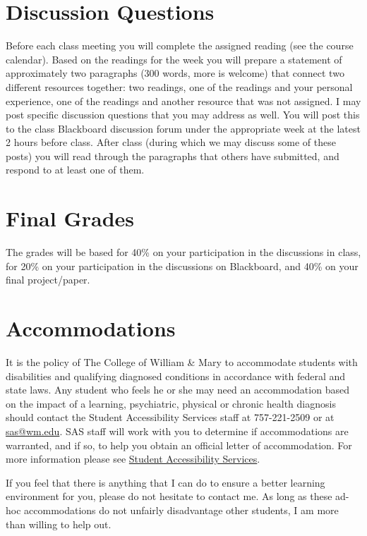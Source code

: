 \documentclass{article}
\begin{document}
\section{Discussion Questions}
Before each class meeting you will complete the assigned reading (see the course calendar). Based on the readings for the week you will prepare a statement of approximately two paragraphs (300 words, more is welcome) that connect two different resources together: two readings, one of the readings and your personal experience, one of the readings and another resource that was not assigned. I may post specific discussion questions that you may address as well. You will post this to the class Blackboard discussion forum under the appropriate week at the latest 2 hours before class. After class (during which we may discuss some of these posts) you will read through the paragraphs that others have submitted, and respond to at least one of them.

\section{Final Grades}
The grades will be based for 40\% on your participation in the discussions in class, for 20\% on your participation in the discussions on Blackboard, and 40\% on your final project/paper.

\section{Accommodations}
It is the policy of The College of William \& Mary to accommodate students with disabilities and qualifying diagnosed conditions in accordance with federal and state laws. Any student who feels he or she may need an accommodation based on the impact of a learning, psychiatric, physical or chronic health diagnosis should contact the Student Accessibility Services staff at 757-221-2509 or at \href{mailto:sas@wm.edu}{sas@wm.edu}. SAS staff will work with you to determine if accommodations are warranted, and if so, to help you obtain an official letter of accommodation. For more information please see \href{http://www.wm.edu/sas}{Student Accessibility Services}.

If you feel that there is anything that I can do to ensure a better learning environment for you, please do not hesitate to contact me. As long as these ad-hoc accommodations do not unfairly disadvantage other students, I am more than willing to help out.
\end{document}
